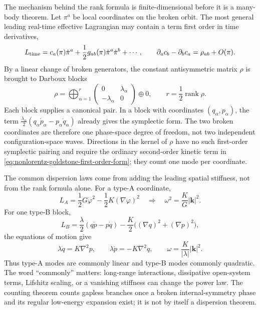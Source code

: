 The mechanism behind the rank formula is finite-dimensional before it is a
many-body theorem.  Let \(\pi^a\) be local coordinates on the broken orbit.
The most general leading real-time effective Lagrangian may contain a term
first order in time derivatives,
\begin{equation}
  L_{\rm time}
  =
  c_a(\pi)\dot\pi^a
  +
  \frac12 g_{ab}(\pi)\dot\pi^a\dot\pi^b+\cdots ,
  \qquad
  \partial_a c_b-\partial_b c_a
  =
  \rho_{ab}+O(\pi).
  \label{eq:nonlorentz-goldstone-first-order-form}
\end{equation}
By a linear change of broken generators, the constant antisymmetric matrix
\(\rho\) is brought to Darboux blocks
\[
  \rho
  =
  \bigoplus_{\alpha=1}^{r}
  \begin{pmatrix}0&\lambda_\alpha\\-\lambda_\alpha&0\end{pmatrix}
  \oplus 0,
  \qquad
  r=\frac12\operatorname{rank}\rho .
\]
Each block supplies a canonical pair.  In a block with coordinates
\((q_\alpha,p_\alpha)\), the term
\(\frac{\lambda_\alpha}{2}(q_\alpha\dot p_\alpha-p_\alpha\dot q_\alpha)\)
already gives the symplectic form.  The two broken coordinates are therefore
one phase-space degree of freedom, not two independent configuration-space
waves.  Directions in the kernel of \(\rho\) have no such first-order
symplectic pairing and require the ordinary second-order kinetic term in
\eqref{eq:nonlorentz-goldstone-first-order-form}; they count one mode per
coordinate.

The common dispersion laws come from adding the leading spatial stiffness,
not from the rank formula alone.  For a type-A coordinate,
\[
  L_A=\frac12 G\dot\varphi^2-\frac12 K(\nabla\varphi)^2
  \quad\Longrightarrow\quad
  \omega^2=\frac{K}{G}|\mathbf k|^2 .
\]
For one type-B block,
\[
  L_B=
  \frac{\lambda}{2}(q\dot p-p\dot q)
  -\frac{K}{2}\bigl((\nabla q)^2+(\nabla p)^2\bigr),
\]
the equations of motion give
\begin{equation}
  \lambda\dot q=K\nabla^2p,
  \qquad
  \lambda\dot p=-K\nabla^2q,
  \qquad
  \omega=\frac{K}{|\lambda|}|\mathbf k|^2 .
  \label{eq:type-b-quadratic-dispersion}
\end{equation}
Thus type-A modes are commonly linear and type-B modes commonly quadratic.
The word ``commonly'' matters: long-range interactions, dissipative open-system
terms, Lifshitz scaling, or a vanishing stiffness can change the power law.
The counting theorem counts gapless branches once a broken internal-symmetry
phase and its regular low-energy expansion exist; it is not by itself a
dispersion theorem.

